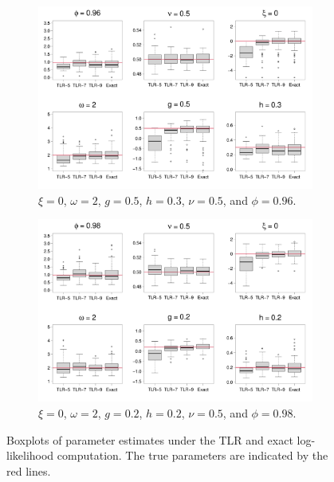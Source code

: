 \documentclass[conference]{IEEEtran}
\begin{document}
\begin{figure}[htp!]
\centering
\begin{subfigure}{0.43\textwidth}%
  \centering
  \includegraphics[width=\linewidth]{./figures/boxplot_0.960000_0.500000_0.300000.pdf}
  \caption{$\xi = 0$, $\omega = 2$, $g = 0.5$, $h = 0.3$, $\nu = 0.5$, and $\phi = 0.96$.}
\end{subfigure}%
\hspace{2mm}
\begin{subfigure}{0.43\textwidth}%
  \centering
  \includegraphics[width=\linewidth]{./figures/boxplot_0.980000_0.200000_0.200000.pdf}
  \caption{  $\xi = 0$, $\omega = 2$, $g = 0.2$, $h = 0.2$, $\nu = 0.5$, and $\phi = 0.98$.}
\end{subfigure}%
\caption{Boxplots of parameter estimates under the TLR and exact log-likelihood computation. The true parameters are indicated by the red lines.}
\label{fig:boxplot}
\end{figure}
\end{document}
